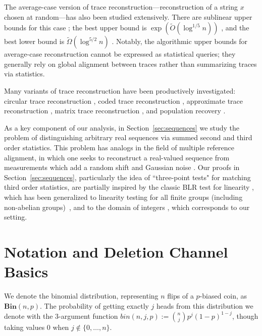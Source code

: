 \documentclass[11pt]{article}
\theoremstyle{plain}
\newcommand{\Bin}[2]{\textbf{Bin}(#1,#2)}
\begin{document}
The average-case version of trace reconstruction---reconstruction of a string $x$ chosen at random---has also been studied extensively. There are sublinear upper bounds for this case \cite{peres17Average,pmlr-v75-holden18a,holden2020subpolynomial}; the best upper bound is $\exp(\tilde{O}(\log^{1/5}n))$ \cite{rubinstein2023average}, and the best lower bound is $\tilde{\Omega}(\log^{5/2}n)$ \cite{chase2021new}. Notably, the algorithmic upper bounds for average-case reconstruction cannot be expressed as statistical queries; they generally rely on global alignment between traces rather than summarizing traces via statistics. 

Many variants of trace reconstruction have been productively investigated: circular trace reconstruction \cite{narayanan2021circular, burudgunte_et_al:LIPIcs.ITCS.2026.30}, coded trace reconstruction \cite{cheraghchi2020coded,brakensiek2020coded}, approximate trace reconstruction \cite{daviesApproximateTraceReconstruction2021,chenApproximateTraceReconstruction2023}, matrix trace reconstruction  \cite{krishnamurthy2021trace}, and population recovery \cite{ban2019beyond, 3458064.3458141, rivkin25a}. 

As a key component of our analysis, in Section~\ref{sec:sequences} we study the problem of distinguishing arbitrary real sequences via summed second and third order statistics. This problem has analogs in the field of multiple reference alignment, in which one seeks to reconstruct a real-valued sequence from measurements which add a random shift and Gaussian noise \cite{perry2019sample, bandeira2023estimation}. Our proofs in Section~\ref{sec:sequences}, particularly the idea of ``three-point tests" for matching third order statistics, are partially inspired by the classic BLR test for linearity \cite{10.1145/100216.100225}, which has been generalized to linearity testing for all finite groups (including non-abelian groups)~\cite{https://doi.org/10.1002/rsa.20182}, and to the domain of integers \cite{devadas2016self}, which corresponds to our setting.








\section{Notation and Deletion Channel Basics}\label{sec:definitions}

We denote the binomial distribution, representing $n$ flips of a $p$-biased coin, as $\Bin{n}{p}$. The probability of getting exactly $j$ heads from this distribution we denote with the 3-argument function $bin(n,j,p):=\binom{n}{j}p^j(1-p)^{1-j}$, though taking values 0 when $j\notin \{0,\ldots,n\}$.
\end{document}
